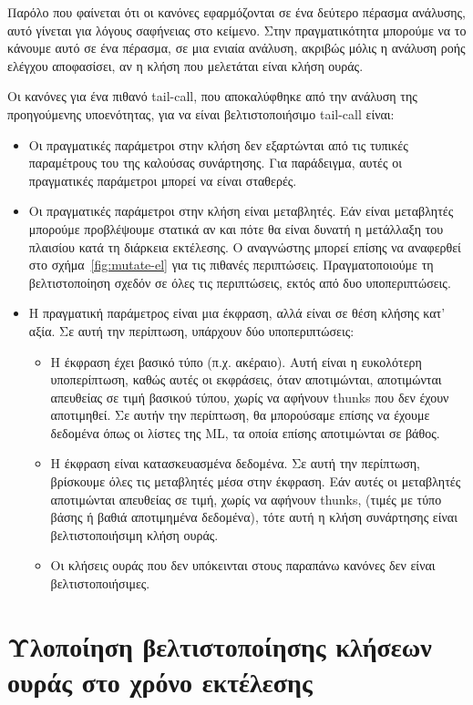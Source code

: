 \documentclass[diploma]{softlab-thesis}
\begin{document}
Παρόλο που φαίνεται ότι οι κανόνες εφαρμόζονται σε ένα δεύτερο πέρασμα ανάλυσης, αυτό γίνεται για λόγους σαφήνειας
στο κείμενο. Στην πραγματικότητα μπορούμε να το κάνουμε αυτό σε ένα πέρασμα, σε μια ενιαία ανάλυση, ακριβώς μόλις η 
ανάλυση ροής ελέγχου αποφασίσει, αν η κλήση που μελετάται είναι κλήση ουράς.


Οι κανόνες για ένα πιθανό tail-call, που αποκαλύφθηκε από την ανάλυση της προηγούμενης υποενότητας, 
για να είναι βελτιστοποιήσιμο tail-call είναι:
\begin{itemize}
  \item Οι πραγματικές παράμετροι στην κλήση δεν εξαρτώνται από τις τυπικές παραμέτρους του της καλούσας συνάρτησης. 
  Για παράδειγμα, αυτές οι πραγματικές παράμετροι μπορεί να είναι σταθερές. 
  \item Οι πραγματικές παράμετροι στην κλήση είναι μεταβλητές. Εάν είναι μεταβλητές μπορούμε
  προβλέψουμε στατικά αν και πότε θα είναι δυνατή η μετάλλαξη του πλαισίου κατά τη διάρκεια εκτέλεσης. 
  Ο αναγνώστης μπορεί επίσης να αναφερθεί στο σχήμα~\ref{fig:mutate-el} για τις πιθανές περιπτώσεις. 
  Πραγματοποιούμε τη βελτιστοποίηση σχεδόν σε όλες τις περιπτώσεις, εκτός από δυο υποπεριπτώσεις.
  \item Η πραγματική παράμετρος είναι μια έκφραση, αλλά είναι σε θέση κλήσης κατ' αξία. Σε αυτή την περίπτωση, υπάρχουν
  δύο υποπεριπτώσεις:
    \begin{itemize}
      \item Η έκφραση έχει βασικό τύπο (π.χ. ακέραιο). Αυτή είναι η ευκολότερη υποπερίπτωση, καθώς αυτές οι εκφράσεις,
      όταν αποτιμώνται, αποτιμώνται απευθείας σε τιμή βασικού τύπου, χωρίς να αφήνουν thunks που δεν έχουν αποτιμηθεί.
      Σε αυτήν την περίπτωση, θα μπορούσαμε επίσης να έχουμε δεδομένα όπως οι λίστες της ML, τα οποία 
      επίσης αποτιμώνται σε βάθος.
      \item Η έκφραση είναι κατασκευασμένα δεδομένα. Σε αυτή την περίπτωση, βρίσκουμε όλες τις μεταβλητές μέσα στην
      έκφραση. Εάν αυτές οι μεταβλητές αποτιμώνται απευθείας σε τιμή, χωρίς να αφήνουν thunks, (τιμές με τύπο βάσης ή βαθιά αποτιμημένα
      δεδομένα), τότε αυτή η κλήση συνάρτησης είναι βελτιστοποιήσιμη κλήση ουράς.
      \item Οι κλήσεις ουράς που δεν υπόκεινται στους παραπάνω κανόνες δεν είναι βελτιστοποιήσιμες.
    \end{itemize}
\end{itemize}



%
\chapter {Υλοποίηση βελτιστοποίησης κλήσεων ουράς στο χρόνο εκτέλεσης}
\end{document}

